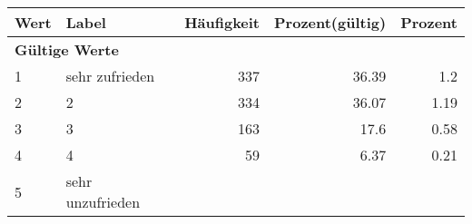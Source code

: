      \begin{longtable}{lXrrr}
     \toprule
     \textbf{Wert} & \textbf{Label} & \textbf{Häufigkeit} & \textbf{Prozent(gültig)} & \textbf{Prozent} \\
     \endhead
     \midrule
     \multicolumn{5}{l}{\textbf{Gültige Werte}}\\

     1 &
     \multicolumn{1}{X}{ sehr zufrieden   } &


       \num{337} &
       \num[round-mode=places,round-precision=2]{36.39} &
         \num[round-mode=places,round-precision=2]{1.2} \\

     2 &
     \multicolumn{1}{X}{ 2   } &


       \num{334} &
       \num[round-mode=places,round-precision=2]{36.07} &
         \num[round-mode=places,round-precision=2]{1.19} \\

     3 &
     \multicolumn{1}{X}{ 3   } &


       \num{163} &
       \num[round-mode=places,round-precision=2]{17.6} &
         \num[round-mode=places,round-precision=2]{0.58} \\

     4 &
     \multicolumn{1}{X}{ 4   } &


       \num{59} &
       \num[round-mode=places,round-precision=2]{6.37} &
         \num[round-mode=places,round-precision=2]{0.21} \\

     5 &
     \multicolumn{1}{X}{ sehr unzufrieden   } &



\end{longtable}

